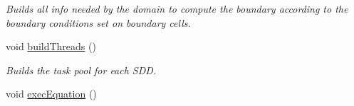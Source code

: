 \begin{DoxyCompactItemize}
\begin{DoxyCompactList}\small\item\em Builds all info needed by the domain to compute the boundary according to the boundary conditions set on boundary cells. \item\end{DoxyCompactList}\item 
void \hyperlink{classDomain_aa2e6cebf44a57323f3c6344d131126c1}{buildThreads} ()
\begin{DoxyCompactList}\small\item\em Builds the task pool for each SDD. \item\end{DoxyCompactList}\item 
\hypertarget{classDomain_ae587a47610505c21fdd32a9f82d70402}{
void \hyperlink{classDomain_ae587a47610505c21fdd32a9f82d70402}{execEquation} ()}
\label{classDomain_ae587a47610505c21fdd32a9f82d70402}


\end{DoxyCompactItemize}
